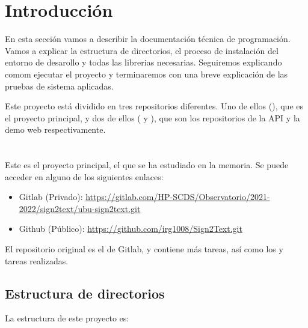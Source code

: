 
\section{Introducción}

En esta sección vamos a describir la documentación técnica de programación. Vamos a explicar la estructura de directorios, el proceso de instalación del entorno de desarollo y todas las librerias necesarias. Seguiremos explicando comom ejecutar el proyecto y terminaremos con una breve explicación de las pruebas de sistema aplicadas.

Este proyecto está dividido en tres repositorios diferentes. Uno de ellos (), que es el proyecto principal, y dos de ellos ( y ), que son los repositorios de la API y la demo web respectivamente.


\section{}

Este es el proyecto principal, el que se ha estudiado en la memoria. Se puede acceder en alguno de los siguientes enlaces:

\begin{itemize}
  \item Gitlab (Privado): \url{https://gitlab.com/HP-SCDS/Observatorio/2021-2022/sign2text/ubu-sign2text.git}
  \item Github (Público): \url{https://github.com/irg1008/Sign2Text.git}
\end{itemize}

El repositorio original es el de Gitlab, y contiene más tareas, así como los  y tareas realizadas.

\subsection{Estructura de directorios}

La estructura de este proyecto es:

